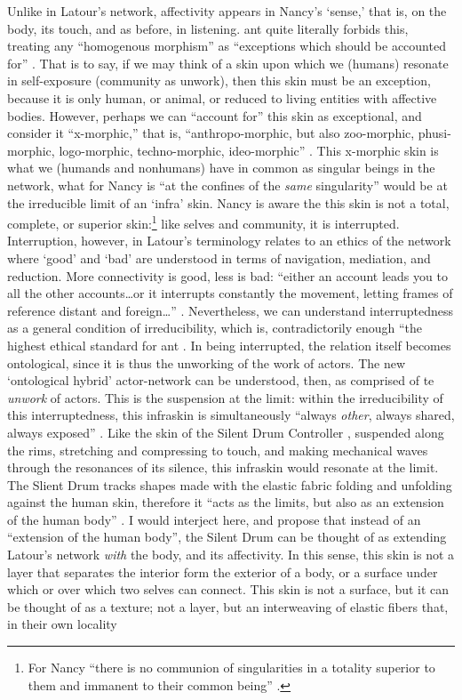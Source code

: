 Unlike in Latour's network, affectivity appears in Nancy's `sense,' that is, on the body, its touch, and as before, in listening. \gls{ant} quite literally forbids this, treating any ``homogenous morphism'' as ``exceptions which should be accounted for'' \parencite[16]{Lat90:On}. That is to say, if we may think of a skin upon which we (humans) resonate in self-exposure (community as unwork), then this skin must be an exception, because it is only human, or animal, or reduced to living entities with affective bodies. However, perhaps we can ``account for'' this skin as exceptional, and consider it ``x-morphic,'' that is, ``anthropo-morphic, but also zoo-morphic, phusi-morphic, logo-morphic, techno-morphic, ideo-morphic'' \parencite[16]{Lat90:On}. This x-morphic skin is what we (humands and nonhumans) have in common as singular beings in the network, what for Nancy is ``at the confines of the \textit{same} singularity'' \parencite[28]{Nan91:The} would be at the irreducible limit of an `infra' skin. Nancy is aware the this skin is not a total, complete, or superior skin:\footnote{For Nancy ``there is no communion of singularities in a totality superior to them and immanent to their common being'' \parencite[28]{Nan91:The}.} like selves and community, it is interrupted. Interruption, however, in Latour's terminology relates to an ethics of the network where `good' and `bad' are understood in terms of navigation, mediation, and reduction. More connectivity is good, less is bad: ``either an account leads you to all the other accounts\dots or it interrupts constantly the movement, letting frames of reference distant and foreign\dots'' \parencite[13-14]{Lat90:On}. Nevertheless, we can understand interruptedness as a general condition of irreducibility, which is, contradictorily enough ``the highest ethical standard for \gls{ant} \parencite[14]{Lat90:On}. In being interrupted, the relation itself becomes ontological, since it is thus the unworking of the work of actors. The new `ontological hybrid' actor-network can be understood, then, as comprised of te \textit{unwork} of actors. This is the suspension at the limit: within the irreducibility of this interruptedness, this infraskin is simultaneously ``always \textit{other}, always shared, always exposed'' \parencite[28]{Nan91:The}. Like the skin of the Silent Drum Controller , suspended along the rims, stretching and compressing to touch, and making mechanical waves through the resonances of its silence, this infraskin would resonate at the limit. The Slient Drum tracks shapes made with the elastic fabric folding and unfolding against the human skin, therefore it ``acts as the limits, but also as an extension of the human body'' \parencite[2]{DBLP:conf/icmc/OliverJ08}. I would interject here, and propose that instead of an ``extension of the human body'', the Silent Drum can be thought of as extending Latour's network \textit{with} the body, and its affectivity. In this sense, this skin is not a layer that separates the interior form the exterior of a body, or a surface under which or over which two selves can connect. This skin is not a surface, but it can be thought of as a texture; not a layer, but an interweaving of elastic fibers  that, in their own locality 